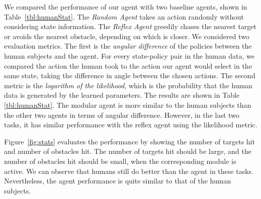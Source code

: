\documentclass[12pt]{report}	%
\theoremstyle{definition}
\theoremstyle{remark}
\begin{document}
We compared the performance of our agent with two baseline agents, shown in
Table~\ref{tbl:humanStat}. The {\em Random Agent} takes an action randomly
without considering state information. The {\em Reflex Agent} greedily chases the nearest target or avoids the nearest obstacle, depending on which is closer. We considered two evaluation metrics. The first is the {\em angular difference} of
the policies between the human subjects and the
agent. For every state-policy pair in the human data, we
compared the action the human took to the action our agent would select in the same state, taking the difference in angle between the chosen actions. The second metric is the {\em logarithm of the likelihood}, which is the
probability that the human data is generated by the learned
parameters. The results are shown in Table \ref{tbl:humanStat}. The modular agent is more similar to the human subjects than the other two agents in terms of angular difference. However, in the last two tasks, it has similar performance with the reflex agent using the likelihood metric.

Figure~\ref{fig:stats} evaluates the performance by showing the number of
targets hit and number of obstacles hit.  The number of targets hit should be
large, and the number of obstacles hit should be small, when the corresponding
module is active.  We can observe that humans still do better than the agent in
these tasks.  Nevertheless, the agent performance is quite similar to that of
the human subjects.
\end{document}
